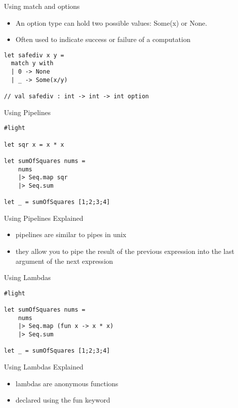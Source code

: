\documentclass[landscape]{slides}
\begin{document}
\begin{slide}{Using match and options}
\begin{itemize}
\item An option type can hold two possible values: Some(x) or None.
\item Often used to indicate success or failure of a computation
\end{itemize}
\begin{verbatim}
let safediv x y = 
  match y with
  | 0 -> None
  | _ -> Some(x/y)
 
// val safediv : int -> int -> int option
\end{verbatim}
\end{slide}

\begin{slide}{Using Pipelines}
\begin{verbatim}
#light

let sqr x = x * x

let sumOfSquares nums =
    nums 
    |> Seq.map sqr
    |> Seq.sum

let _ = sumOfSquares [1;2;3;4]
\end{verbatim}
\end{slide}

\begin{slide}{Using Pipelines Explained}
\begin{itemize}
\item pipelines are similar to pipes in unix
\item they allow you to pipe the result of the previous expression into the last argument of the next expression
\end{itemize}
\end{slide}

\begin{slide}{Using Lambdas}
\begin{verbatim}
#light

let sumOfSquares nums =
    nums 
    |> Seq.map (fun x -> x * x) 
    |> Seq.sum

let _ = sumOfSquares [1;2;3;4]
\end{verbatim}
\end{slide}

\begin{slide}{Using Lambdas Explained}
\begin{itemize}
\item lambdas are anonymous functions
\item declared using the fun keyword
\end{itemize}
\end{slide}
\end{document}
